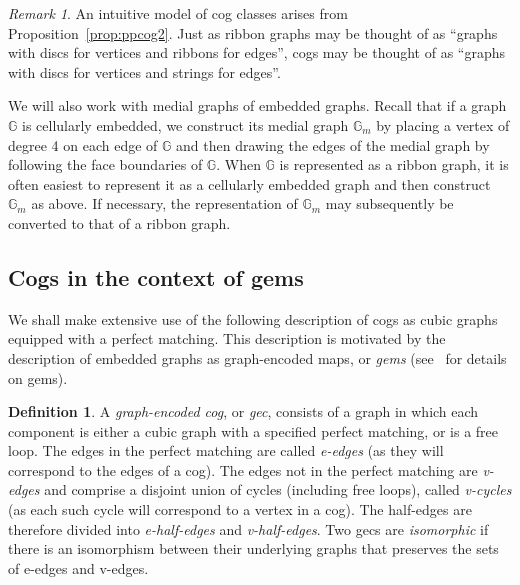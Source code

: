 \documentclass{amsart}
\newcommand{\bG}{\mathbb{G}}
\theoremstyle{definition}
\newtheorem{definition}[theorem]{Definition}
\theoremstyle{remark}
\newtheorem{remark}[theorem]{Remark}
\numberwithin{equation}{section}
\begin{document}
\medskip

\begin{remark}
An intuitive model of cog classes arises from Proposition~\ref{prop:ppcog2}.  
Just as ribbon graphs may be thought of as ``graphs with discs for vertices and ribbons for edges'',  
cogs may be thought of as ``graphs with discs for vertices and strings for edges''.
\end{remark}


We will also work with medial graphs of embedded graphs.  Recall that if a graph $\bG$ is cellularly embedded, we construct its medial graph $\bG_m$ by placing
a vertex of degree 4 on each edge of  $\bG$ and then drawing the edges of the medial
graph by following the face boundaries of $\bG$.  When $\bG$ is represented as a ribbon graph, it is often easiest to represent it as a cellularly embedded graph and then construct $\bG_m$ as above. 
 If necessary, the representation of $\bG_m$ may subsequently be converted to that of a ribbon graph. 


\subsection{Cogs in the context of gems}\label{ss:coggem}
We shall make extensive use of the following description of cogs as cubic graphs equipped with a perfect matching. This description is motivated by the description of embedded graphs as graph-encoded maps, or \emph{gems} (see~\cite{zbMATH00824939,zbMATH03728291} for details on gems).

\begin{definition}
  A \emph{graph-encoded cog}, or \emph{gec}, consists of a graph in which each component is either a cubic graph with a specified perfect matching, or is a free loop. The edges in the perfect matching are called \emph{e-edges} (as they will correspond to the edges of a cog). 
The edges not in the perfect matching are \emph{v-edges} and comprise a disjoint union of cycles (including free loops), called \emph{v-cycles} (as each such cycle will correspond to a vertex in a cog).
The half-edges are therefore divided into \emph{e-half-edges} and \emph{v-half-edges}.
Two gecs are \emph{isomorphic} if there is an isomorphism between their underlying graphs that preserves the sets of e-edges and v-edges.
\end{definition}
\end{document}
